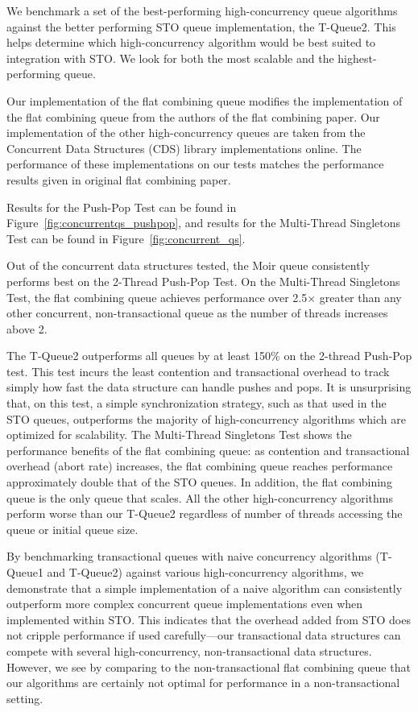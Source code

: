 We benchmark a set of the best-performing high-concurrency queue algorithms against the better performing STO queue implementation, the T-Queue2. This helps determine which high-concurrency algorithm would be best suited to integration with STO. We look for both the most scalable and the highest-performing queue.
 
 Our implementation of the flat combining queue modifies the implementation of the flat combining queue from the authors of the flat combining paper\cite{flatcombining}. Our implementation of the other high-concurrency queues are taken from the Concurrent Data Structures (CDS) library implementations online\cite{libcds}. The performance of these implementations on our tests matches the performance results given in original flat combining paper. 

 Results for the Push-Pop Test can be found in Figure~\ref{fig:concurrentqs_pushpop}, and results for the Multi-Thread Singletons Test can be found in Figure~\ref{fig:concurrent_qs}.

Out of the concurrent data structures tested, the Moir queue\cite{queue2} consistently performs best on the 2-Thread Push-Pop Test. On the Multi-Thread Singletons Test, the flat combining queue achieves performance over 2.5$\times$ greater than any other concurrent, non-transactional queue as the number of threads increases above 2.

The T-Queue2 outperforms all queues by at least 150\% on the 2-thread Push-Pop test. This test incurs the least contention and transactional overhead to track simply how fast the data structure can handle pushes and pops. It is unsurprising that, on this test, a simple synchronization strategy, such as that used in the STO queues, outperforms the majority of high-concurrency algorithms which are optimized for scalability. The Multi-Thread Singletons Test shows the performance benefits of the flat combining queue: as contention and transactional overhead (abort rate) increases, the flat combining queue reaches performance approximately double that of the STO queues. In addition, the flat combining queue is the only queue that scales. All the other high-concurrency algorithms perform worse than our T-Queue2 regardless of number of threads accessing the queue or initial queue size.

By benchmarking transactional queues with naive concurrency algorithms (T-Queue1 and T-Queue2) against various high-concurrency algorithms, we demonstrate that a simple implementation of a naive algorithm can consistently outperform more complex concurrent queue implementations even when implemented within STO. This indicates that the overhead added from STO does not cripple performance if used carefully---our transactional data structures can compete with several high-concurrency, non-transactional data structures. However, we see by comparing to the non-transactional flat combining queue that our algorithms are certainly not optimal for performance in a non-transactional setting.

